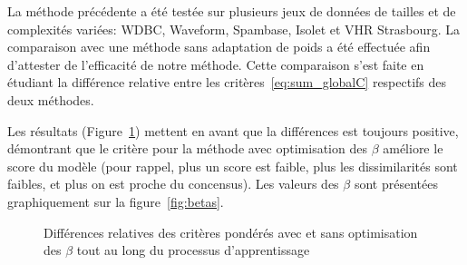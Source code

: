 \documentclass[a4paper]{article}
\begin{document}
La méthode précédente a été testée sur plusieurs jeux de données de tailles et de complexités variées: WDBC, Waveform, Spambase, Isolet et VHR Strasbourg. La comparaison avec une méthode sans adaptation de poids a été effectuée afin d'attester de l'efficacité de notre méthode. Cette comparaison s'est faite en étudiant la différence relative entre les critères~\ref{eq:sum_globalC} respectifs des deux méthodes. 

Les résultats (Figure~\ref{fig:relative_difference}) mettent en avant que la différences est toujours positive, démontrant que le critère pour la méthode avec optimisation des $\beta$ améliore le score du modèle (pour rappel, plus un score est faible, plus les dissimilarités sont faibles, et plus on est proche du concensus). Les valeurs des $\beta$ sont présentées graphiquement sur la figure~\ref{fig:betas}.

\begin{figure}[!h]
	\centering
	\caption{Différences relatives des critères pondérés avec et sans optimisation des $\beta$ tout au long du processus d'apprentissage}
\label{fig:relative_difference}
\end{figure}
\end{document}
